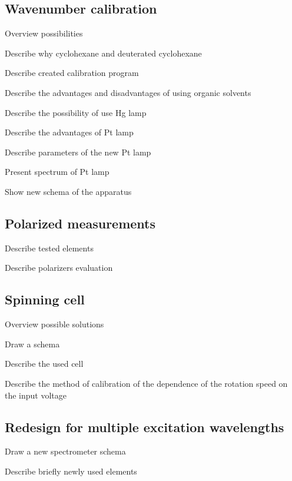 \subsection{Wavenumber calibration}
\begin{docitemize}
	\item Overview possibilities
	\item Describe why cyclohexane and deuterated cyclohexane
	\item Describe created calibration program
	\item Describe the advantages and disadvantages of using organic solvents
	\item Describe the possibility of use Hg lamp
	\item Describe the advantages of Pt lamp
	\item Describe parameters of the new Pt lamp
	\item Present spectrum of Pt lamp
	\item Show new schema of the apparatus
\end{docitemize}


\subsection{Polarized measurements}
\begin{docitemize}
	\item Describe tested elements
	\item Describe polarizers evaluation
\end{docitemize}


\subsection{Spinning cell}
\begin{docitemize}
	\item Overview possible solutions
	\item Draw a schema
	\item Describe the used cell
	\item Describe the method of calibration of the dependence of the rotation
	speed on the input voltage
\end{docitemize}


\subsection{Redesign for multiple excitation wavelengths}
\begin{docitemize}
	\item Draw a new spectrometer schema
	\item Describe briefly newly used elements
\end{docitemize}


